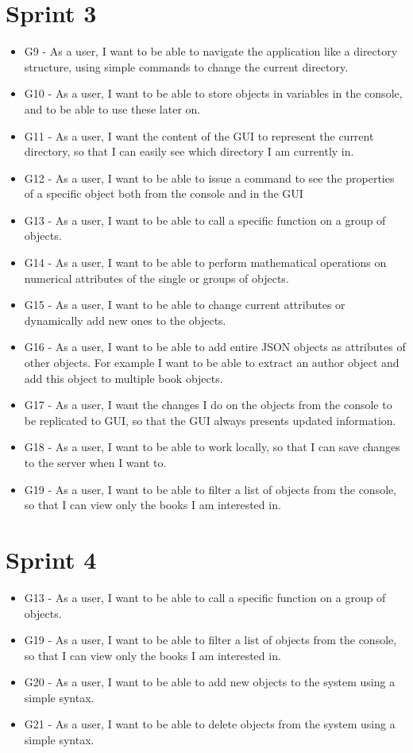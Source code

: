 \section{Sprint 3}
\label{sprint3pb}

\begin{itemize}
\item G9 - As a user, I want to be able to navigate the application like a directory structure, using simple commands to change the current directory.
\item G10 - As a user, I want to be able to store objects in variables in the console, and to be able to use these later on.
\item G11 - As a user, I want the content of the GUI to represent the current directory, so that I can easily see which directory I am currently in.
\item G12 - As a user, I want to be able to issue a command to see the properties of a specific object both from the console and in the GUI
\item G13 - As a user, I want to be able to call a specific function on a group of objects.
\item G14 - As a user, I want to be able to perform mathematical operations on numerical attributes of the single or groups of objects.
\item G15 - As a user, I want to be able to change current attributes or dynamically add new ones to the objects.
\item G16 - As a user, I want to be able to add entire JSON objects as attributes of other objects. For example I want to be able to extract an author object and add this object to multiple book objects.
\item G17 - As a user, I want the changes I do on the objects from the console to be replicated to GUI, so that the GUI always presents updated information.
\item G18 - As a user, I want to be able to work locally, so that I can save changes to the server when I want to.
\item G19 - As a user, I want to be able to filter a list of objects from the console, so that I can view only the books I am interested in.
\end{itemize}

\section{Sprint 4}
\label{sprint4pb}

\begin{itemize}
\item G13 - As a user, I want to be able to call a specific function on a group of objects.
\item G19 - As a user, I want to be able to filter a list of objects from the console, so that I can view only the books I am interested in.
\item G20 - As a user, I want to be able to add new objects to the system using a simple syntax.
\item G21 - As a user, I want to be able to delete objects from the system using a simple syntax.
\end{itemize}
